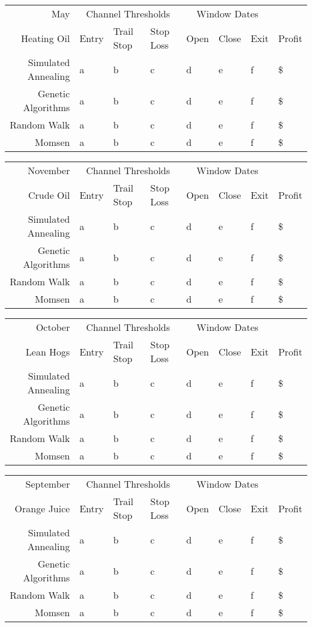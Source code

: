 \documentclass[12pt]{article}
\begin{document}
\begin{tabular}{|r|l|l|l|l|l|l|l|}
  \hline
  May & \multicolumn{3}{|c|}{Channel Thresholds} & \multicolumn{3}{|c|}{Window Dates} &  \\
  Heating Oil & Entry & Trail Stop & Stop Loss & Open & Close & Exit & Profit\\ \hline
  Simulated Annealing & a & b & c & d & e & f & \$ \\ \hline
  Genetic Algorithms & a & b & c & d & e & f & \$ \\ \hline
  Random Walk & a & b & c & d & e & f & \$ \\ \hline
  Momsen &  a & b & c & d & e & f & \$ \\ \hline
\end{tabular}

\begin{tabular}{|r|l|l|l|l|l|l|l|}
  \hline
  November & \multicolumn{3}{|c|}{Channel Thresholds} & \multicolumn{3}{|c|}{Window Dates} &  \\
  Crude Oil & Entry & Trail Stop & Stop Loss & Open & Close & Exit & Profit\\ \hline
  Simulated Annealing & a & b & c & d & e & f & \$ \\ \hline
  Genetic Algorithms & a & b & c & d & e & f & \$ \\ \hline
  Random Walk & a & b & c & d & e & f & \$ \\ \hline
  Momsen &  a & b & c & d & e & f & \$ \\ \hline
\end{tabular}

\begin{tabular}{|r|l|l|l|l|l|l|l|}
  \hline
  October & \multicolumn{3}{|c|}{Channel Thresholds} & \multicolumn{3}{|c|}{Window Dates} &  \\
  Lean Hogs & Entry & Trail Stop & Stop Loss & Open & Close & Exit & Profit\\ \hline
  Simulated Annealing & a & b & c & d & e & f & \$ \\ \hline
  Genetic Algorithms & a & b & c & d & e & f & \$ \\ \hline
  Random Walk & a & b & c & d & e & f & \$ \\ \hline
  Momsen &  a & b & c & d & e & f & \$ \\ \hline
\end{tabular}

\begin{tabular}{|r|l|l|l|l|l|l|l|}
  \hline
  September    & \multicolumn{3}{|c|}{Channel Thresholds} & \multicolumn{3}{|c|}{Window Dates} &  \\
  Orange Juice & Entry & Trail Stop & Stop Loss & Open & Close & Exit & Profit\\ \hline
  Simulated Annealing & a & b & c & d & e & f & \$ \\ \hline
  Genetic Algorithms & a & b & c & d & e & f & \$ \\ \hline
  Random Walk & a & b & c & d & e & f & \$ \\ \hline
  Momsen &  a & b & c & d & e & f & \$ \\ \hline
\end{tabular}
\end{document}
